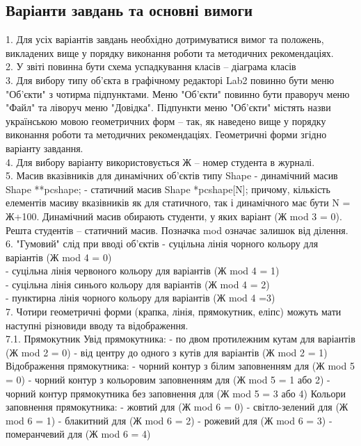 \documentclass[14pt]{article}
\begin{document}
\subsection{Варіанти завдань та основні вимоги}
1. Для усіх варіантів завдань необхідно дотримуватися вимог та
положень, викладених вище у порядку виконання роботи та методичних
рекомендаціях. \\
2. У звіті повинна бути схема успадкування класів – діаграма класів \\
3. Для вибору типу об’єкта в графічному редакторі Lab2 повинно бути
меню "Об’єкти" з чотирма підпунктами. Меню "Об’єкти" повинно бути
праворуч меню "Файл" та ліворуч меню "Довідка". Підпункти меню
"Об’єкти" містять назви українською мовою геометричних форм – так, як
наведено вище у порядку виконання роботи та методичних рекомендаціях.
Геометричні форми згідно варіанту завдання. \\
4. Для вибору варіанту використовується Ж – номер студента в
журналі. \\
5. Масив вказівників для динамічних об’єктів типу Shape
- динамічний масив Shape **pcshape;
- статичний масив Shape *pcshape[N];
причому, кількість елементів масиву вказівників як для статичного, так і
динамічного має бути N = Ж+100.
Динамічний масив обирають студенти, у яких варіант (Ж mod 3 = 0).
Решта студентів – статичний масив. Позначка mod означає залишок від
ділення. \\
6. "Гумовий" слід при вводі об’єктів
- суцільна лінія чорного кольору для варіантів (Ж mod 4 = 0) \\
- суцільна лінія червоного кольору для варіантів (Ж mod 4 = 1) \\
- суцільна лінія синього кольору для варіантів (Ж mod 4 = 2) \\
- пунктирна лінія чорного кольору для варіантів (Ж mod 4 =3) \\
7. Чотири геометричні форми (крапка, лінія, прямокутник, еліпс)
можуть мати наступні різновиди вводу та відображення. \\
7.1. Прямокутник
Увід прямокутника:
- по двом протилежним кутам для варіантів (Ж mod 2 = 0)
- від центру до одного з кутів для варіантів (Ж mod 2 = 1)
Відображення прямокутника:
- чорний контур з білим заповненням для (Ж mod 5 = 0)
- чорний контур з кольоровим заповненням для (Ж mod 5 = 1 або 2)
- чорний контур прямокутника без заповнення для (Ж mod 5 = 3 або 4)
Кольори заповнення прямокутника:
- жовтий для (Ж mod 6 = 0)
- світло-зелений для (Ж mod 6 = 1)
- блакитний для (Ж mod 6 = 2)
- рожевий для (Ж mod 6 = 3)
- померанчевий для (Ж mod 6 = 4)
\end{document}
